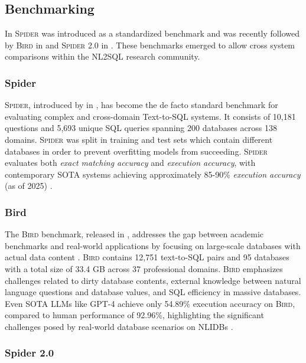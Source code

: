 \subsection{Benchmarking}

In \citeyear{Spider} \textsc{Spider} was introduced as a standardized benchmark
and was recently followed by \textsc{Bird} in \citeyear{BIRD} and
\textsc{Spider 2.0} in \citeyear{Spider2}. These benchmarks emerged to allow
cross system comparisons within the NL2SQL research community.

\subsubsection{Spider}\label{lit:benchmarks:spider}

\textsc{Spider}, introduced by \citeauthor{Spider} in \citeyear{Spider}, has
become the de facto standard benchmark for evaluating complex and cross-domain
Text-to-SQL systems. It consists of 10,181 questions and 5,693 unique SQL
queries spanning 200 databases across 138 domains. \textsc{Spider}
was split in training and test sets which contain different databases in order
to prevent overfitting models from succeeding. \textsc{Spider} evaluates both
\textit{exact matching accuracy} and \textit{execution accuracy}, with
contemporary SOTA systems achieving approximately 85-90\% \textit{execution
accuracy} (as of 2025) \citep{Spider, OmniSQL, XiYan, CHASE}.

\subsubsection{Bird}\label{lit:benchmarks:bird}

The \textsc{Bird} benchmark, released in \citeyear{BIRD}, addresses the gap between
academic benchmarks and real-world applications by focusing on large-scale
databases with actual data content \citep{BIRD}. \textsc{Bird} contains 12,751
text-to-SQL pairs and 95 databases with a total size of 33.4 GB across 37
professional domains. \textsc{Bird} emphasizes challenges
related to dirty database contents, external knowledge between natural language
questions and database values, and SQL efficiency in massive databases.
Even SOTA LLMs like GPT-4 achieve only
54.89\% execution accuracy on \textsc{Bird}, compared to human performance of
92.96\%, highlighting the significant challenges posed by real-world database
scenarios on NLIDBs \citep{BIRD}.

\subsubsection{Spider 2.0}\label{lit:benchmarks:spider2}

